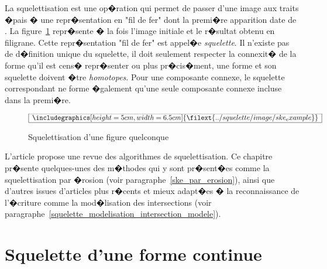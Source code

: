 
\firstpassagedo{}

\firstpassagedo{}

\sloppy

\label{annexe_squelettisation}


La squelettisation est une op�ration qui permet de passer d'une image aux traits �pais � une repr�sentation en "fil de fer" dont la premi�re apparition date de . La figure~\ref{squelette_fig2} repr�sente � la fois l'image initiale et le r�sultat obtenu en filigrane. Cette repr�sentation "fil de fer" est appel�e \emph{squelette}. Il n'existe pas de d�finition unique du squelette, il doit seulement respecter la connexit� de la forme qu'il est cens� repr�senter ou plus pr�cis�ment, une forme et son squelette doivent �tre \emph{homotopes}. Pour une composante connexe, le squelette correspondant ne forme �galement qu'une seule composante connexe incluse dans la premi�re. 



            \begin{figure}[ht]
        $$\frame{$\begin{array}[c]{c}\includegraphics[height=5cm, width=6.5cm]
        {\filext{../squelette/image/ske_example}}\end{array}$}$$
        \caption{Squelettisation d'une figure quelconque}
        \label{squelette_fig2}
            \end{figure}

L'article  propose une revue des algorithmes de squelettisation. Ce chapitre pr�sente quelques-unes des m�thodes qui y sont pr�sent�es comme la squelettisation par �rosion (voir paragraphe~\ref{ske_par_erosion}), ainsi que d'autres issues d'articles plus r�cents et mieux adapt�es � la reconnaissance de l'�criture comme la mod�lisation des intersections (voir paragraphe~\ref{squelette_modelisation_intersection_modele}).









\section{Squelette d'une forme continue}

